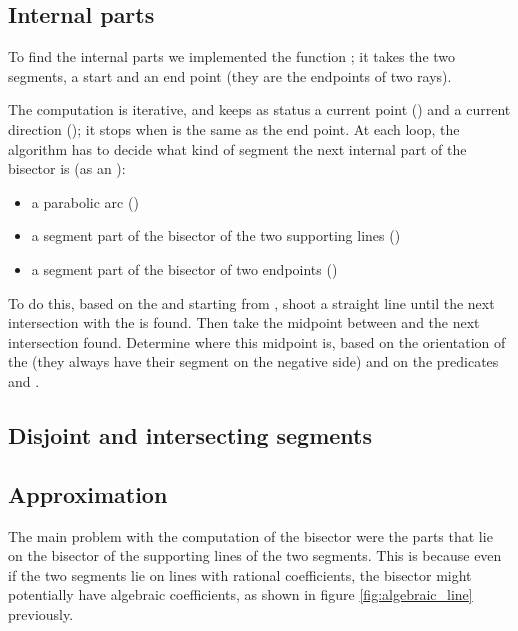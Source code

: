 \documentclass[11pt,a4paper,english]{article}
\begin{document}
	\subsection{Internal parts}
	To find the internal parts we implemented the function ; it takes the two segments, a start and an end point (they are the endpoints of two rays).\par
	The computation is iterative, and keeps as status a current point () and a current direction (); it stops when  is the same as the end point.
	At each loop, the algorithm has to decide what kind of segment the next internal part of the bisector is (as an ):
	\begin{itemize}[label=\(\triangleright\)]\setlength{\itemsep}{-2pt}
	\item a parabolic arc \hfill()
	\item a segment part of the bisector of the two supporting lines \hfill()
	\item a segment part of the bisector of two endpoints \hfill()
	\end{itemize}
	To do this, based on the  and starting from , shoot a straight line until the next intersection with the  is found. Then take the midpoint between  and the next intersection found. Determine where this midpoint is, based on the orientation of the  (they always have their segment on the negative side) and on the predicates  and .
	
	\subsection{Disjoint and intersecting segments}
	
	\subsection{Approximation}
	The main problem with the computation of the bisector were the parts that lie on the bisector of the supporting lines of the two segments. This is because even if the two segments lie on lines with rational coefficients, the bisector might potentially have algebraic coefficients, as shown in figure \ref{fig:algebraic_line} previously.\ppar
\end{document}
